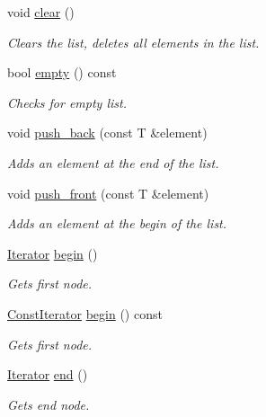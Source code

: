 \begin{DoxyCompactItemize}
\item 
void \hyperlink{classirr_1_1core_1_1list_aad18996ed41454bf7bb8e1d3199f4e73}{clear} ()
\begin{DoxyCompactList}\small\item\em Clears the list, deletes all elements in the list. \end{DoxyCompactList}\item 
bool \hyperlink{classirr_1_1core_1_1list_a4a51f1a7101bc5e22b65e1c18cc6fb7d}{empty} () const 
\begin{DoxyCompactList}\small\item\em Checks for empty list. \end{DoxyCompactList}\item 
void \hyperlink{classirr_1_1core_1_1list_a0f73ebd87279766f339cb1462c2a24d1}{push\+\_\+back} (const T \&element)
\begin{DoxyCompactList}\small\item\em Adds an element at the end of the list. \end{DoxyCompactList}\item 
void \hyperlink{classirr_1_1core_1_1list_aec58963596cbc0435e706d1d00777b61}{push\+\_\+front} (const T \&element)
\begin{DoxyCompactList}\small\item\em Adds an element at the begin of the list. \end{DoxyCompactList}\item 
\hyperlink{classirr_1_1core_1_1list_1_1Iterator}{Iterator} \hyperlink{classirr_1_1core_1_1list_aebd05a0f5e5ead6e1d5b6e3973da8039}{begin} ()
\begin{DoxyCompactList}\small\item\em Gets first node. \end{DoxyCompactList}\item 
\hyperlink{classirr_1_1core_1_1list_1_1ConstIterator}{Const\+Iterator} \hyperlink{classirr_1_1core_1_1list_afd5e08fa782786d898aad30d8c09cf42}{begin} () const 
\begin{DoxyCompactList}\small\item\em Gets first node. \end{DoxyCompactList}\item 
\hyperlink{classirr_1_1core_1_1list_1_1Iterator}{Iterator} \hyperlink{classirr_1_1core_1_1list_aa80509dac5224fa57cc548e39480a115}{end} ()
\begin{DoxyCompactList}\small\item\em Gets end node. \end{DoxyCompactList}\item 

\end{DoxyCompactItemize}
